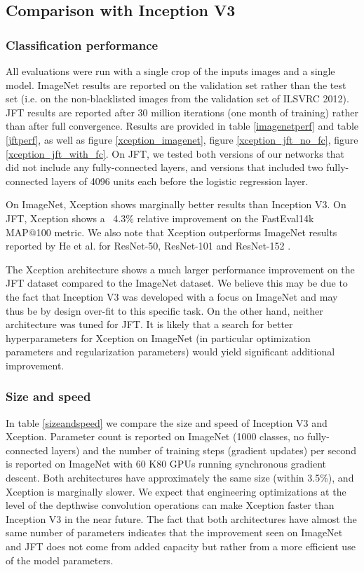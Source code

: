 \subsection{Comparison with Inception V3}

\subsubsection{Classification performance}

All evaluations were run with a single crop of the inputs images and a single model. ImageNet results are reported on the validation set rather than the test set (i.e. on the non-blacklisted images from the validation set of ILSVRC 2012). JFT results are reported after 30 million iterations (one month of training) rather than after full convergence. Results are provided in table \ref{imagenetperf} and table \ref{jftperf}, as well as figure \ref{xception_imagenet}, figure \ref{xception_jft_no_fc}, figure \ref{xception_jft_with_fc}. On JFT, we tested both versions of our networks that did not include any fully-connected layers, and versions that included two fully-connected layers of 4096 units each before the logistic regression layer.

On ImageNet, Xception shows marginally better results than Inception V3. On JFT, Xception shows a ~4.3\% relative improvement on the FastEval14k MAP@100 metric. We also note that Xception outperforms ImageNet results reported by He et al. for ResNet-50, ResNet-101 and ResNet-152 \cite{he2015deep}.

The Xception architecture shows a much larger performance improvement on the JFT dataset compared to the ImageNet dataset. We believe this may be due to the fact that Inception V3 was developed with a focus on ImageNet and may thus be by design over-fit to this specific task. On the other hand, neither architecture was tuned for JFT. It is likely that a search for better hyperparameters for Xception on ImageNet (in particular optimization parameters and regularization parameters) would yield significant additional improvement.

\subsubsection{Size and speed}

In table \ref{sizeandspeed} we compare the size and speed of Inception V3 and Xception. Parameter count is reported on ImageNet (1000 classes, no fully-connected layers) and the number of training steps (gradient updates) per second is reported on ImageNet with 60 K80 GPUs running synchronous gradient descent. Both architectures have approximately the same size (within 3.5\%), and Xception is marginally slower. We expect that engineering optimizations at the level of the depthwise convolution operations can make Xception faster than Inception V3 in the near future. The fact that both architectures have almost the same number of parameters indicates that the improvement seen on ImageNet and JFT does not come from added capacity but rather from a more efficient use of the model parameters.

